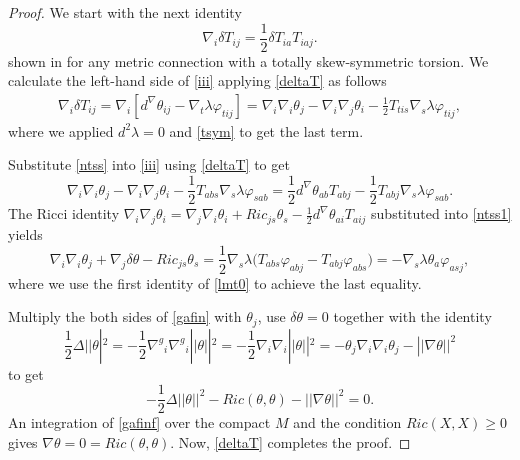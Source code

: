 \documentclass[10pt,british]{article}
\def\sb {{\nabla}}
\def\LC{{\nabla^g}}
\def\p{{\varphi}}
\begin{document}
\begin{proof} We start with the next identity
\begin{equation}\label{iii}
\sb_i\delta T_{ij}=\frac12\delta T_{ia}T_{iaj}.
\end{equation}
 shown in \cite[Proposition~3.2]{IS} for any metric connection with a totally skew-symmetric torsion. %
We calculate the left-hand side  of \eqref{iii} applying \eqref{deltaT} as follows
\begin{equation}\label{ntss}
\begin{split}
\sb_i\delta T_{ij}=\sb_i[d^{\sb}\theta_{ij}-\sb_t\lambda\p_{tij}]=%
\sb_i\sb_i\theta_j-\sb_i\sb_j\theta_i-\frac12T_{tis}\sb_s\lambda\p_{tij},
\end{split}
\end{equation}
where we applied $d^2\lambda=0$ and \eqref{tsym} to get the last term.

Substitute \eqref{ntss} into \eqref{iii} using \eqref{deltaT} to get
\begin{equation}\label{ntss1}
\sb_i\sb_i\theta_j-\sb_i\sb_j\theta_i-\frac12T_{abs}\sb_s\lambda\p_{sab}=\frac12d^{\sb}\theta_{ab}T_{abj}-\frac12T_{abj}\sb_s\lambda\p_{sab}.
\end{equation}
The Ricci identity  
$\sb_i\sb_j\theta_i=%
\sb_j\sb_i\theta_i+Ric_{js}\theta_s-\frac12d^{\sb}\theta_{ai}T_{aij}$ substituted into \eqref{ntss1} yields
\begin{equation}\label{gafin}
\sb_i\sb_i\theta_j+\sb_j\delta\theta-Ric_{js}\theta_s=\frac12\sb_s\lambda\Big(T_{abs}\p_{abj}-T_{abj}\p_{abs}  \Big)=-\sb_s\lambda\theta_a\p_{asj},
\end{equation}
where we use the first identity of \eqref{lmt0} to achieve the last equality. 

Multiply the both sides of \eqref{gafin} with $\theta_j$, use  $\delta\theta=0$ together with the identity 
$$\frac12\Delta||\theta|^2=-\frac12\LC_i\LC_i||\theta||^2=-\frac12\sb_i\sb_i||\theta||^2=-\theta_j\sb_i\sb_i\theta_j-||\sb\theta||^2$$ 
to get
\begin{equation}\label{gafinf}
-\frac12\Delta||\theta||^2-Ric(\theta,\theta)-||\sb\theta||^2=0.
\end{equation}
An integration of \eqref{gafinf} over the compact $M$ and  the condition $Ric(X,X)\ge 0$ gives $\sb\theta=0=Ric(\theta,\theta)$. Now,  \eqref{deltaT} completes the proof.
\end{proof}
\end{document}
